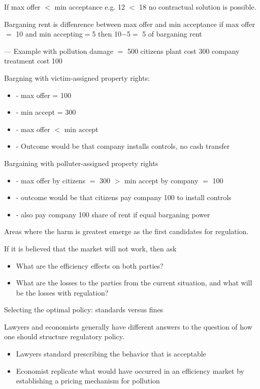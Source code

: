 \documentclass[11pt]{article} %
\begin{document}
If max offer $<$ min acceptance
e.g. 12 $<$ 18
 no contractual solution is possible.

Barganing rent is diffenrence between max offer and min acceptance
if max offer $=$ 10 and min accepting$=$5
then 10$-$5$=$ 5 of barganing rent


--- Example with pollution
damage $=$ 500
citizens plant cost 300
company treatment cost 100

Bargning with victim-assigned property rights:
\begin{itemize}
	\item	- max offer = 100 
	\item- min accept = 300
	\item- max offer $<$ min accept
	\item- Outcome would be that company installs controls, no cash transfer
\end{itemize}
Bargaining with polluter-assigned property rights

\begin{itemize}
	\item 	- max offer by citizens $=$ 300 $>$ min accept by company $=$ 100
	\item - outcome would be that citizens pay company 100 to install controls 
	\item 	- also pay company 100 share of rent if equal barganing power
\end{itemize}
Areas where the harm is greatest emerge as the first candidates for regulation.

If it is believed that the market will not work, then ask
\begin{itemize}
	\item What are the efficiency effects on both parties?
	\item What are the losses to the parties from the current situation, and what will be the losses with regulation?
\end{itemize}

Selecting the optimal policy: standards versus fines

Lawyers and economists generally have different answers to the question of how one should structure regulatory policy.
\begin{itemize}
\item Lawyers standard prescribing the behavior that is acceptable
\item Economist replicate what would have occurred in an efficiency market by establishing a pricing mechanism for pollution
\end{itemize}
\end{document}
